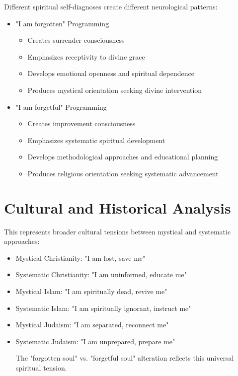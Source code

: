 \documentclass[11pt,twoside]{book}
\begin{document}
Different spiritual self-diagnoses create different neurological patterns:
\begin{itemize}
\item "I am forgotten" Programming
\label{sec:org38247bb}
\begin{itemize}
\item Creates surrender consciousness
\item Emphasizes receptivity to divine grace
\item Develops emotional openness and spiritual dependence
\item Produces mystical orientation seeking divine intervention
\end{itemize}
\item "I am forgetful" Programming
\label{sec:org7fb4e51}
\begin{itemize}
\item Creates improvement consciousness
\item Emphasizes systematic spiritual development
\item Develops methodological approaches and educational planning
\item Produces religious orientation seeking systematic advancement
\end{itemize}
\end{itemize}
\section*{Cultural and Historical Analysis}
\label{sec:orgf5683b9}

This represents broader cultural tensions between mystical and systematic approaches:
\begin{itemize}
\item Mystical Christianity: "I am lost, save me"
\label{sec:org4e6a3d1}
\item Systematic Christianity: "I am uninformed, educate me"
\label{sec:orgc3fb598}

\item Mystical Islam: "I am spiritually dead, revive me"
\label{sec:org6216c32}
\item Systematic Islam: "I am spiritually ignorant, instruct me"
\label{sec:orge9760a9}

\item Mystical Judaism: "I am separated, reconnect me"
\label{sec:org64f257a}
\item Systematic Judaism: "I am unprepared, prepare me"
\label{sec:org82c42af}

The "forgotten soul" vs. "forgetful soul" alteration reflects this universal spiritual tension.
\end{itemize}
\end{document}
